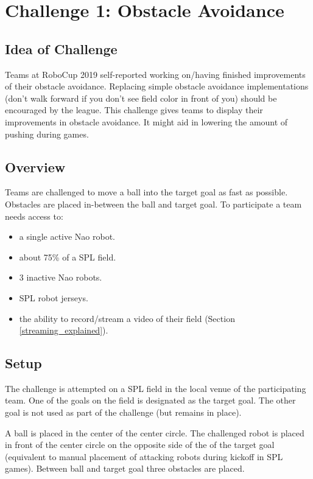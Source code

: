\section{Challenge 1: Obstacle Avoidance}
\label{sec:ObstacleAvoidance}

\subsection{Idea of Challenge}

Teams at RoboCup 2019 self-reported working on/having finished improvements of their obstacle avoidance. Replacing simple obstacle avoidance implementations (don't walk forward if you don't see field color in front of you) should be encouraged by the league. This challenge gives teams to display their improvements in obstacle avoidance. It might aid in lowering the amount of pushing during games.

\subsection{Overview}

Teams are challenged to move a ball into the target goal as fast as possible. Obstacles are placed in-between the ball and target goal. To participate a team needs access to:

\begin{itemize}
	\item a single active Nao robot.
	\item about 75\% of a SPL field.
	\item 3 inactive Nao robots.
	\item SPL robot jerseys.
	\item the ability to record/stream a video of their field (\cf Section \ref{streaming_explained}).
\end{itemize}

\subsection{Setup}

The challenge is attempted on a SPL field in the local venue of the participating team. One of the goals on the field is designated as the target goal. The other goal is not used as part of the challenge (but remains in place).

A ball is placed in the center of the center circle. The challenged robot is placed in front of the center circle on the opposite side of the of the target goal (equivalent to manual placement of attacking robots during kickoff in SPL games). Between ball and target goal three obstacles are placed.

